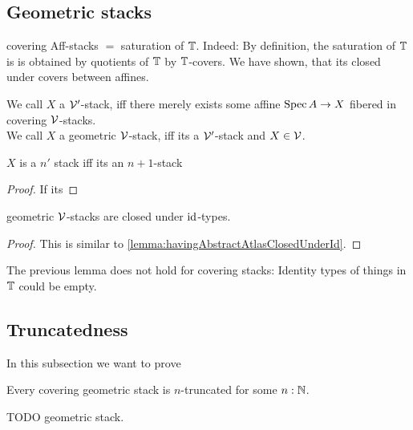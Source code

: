 \documentclass{article}
\begin{document}
\subsection{Geometric stacks}

\begin{example}
	covering Aff-stacks $=$ saturation of $\mathbb{T}$. Indeed: By definition, the saturation of $\mathbb{T}$ is is obtained by quotients of $\mathbb{T}$ by $\mathbb{T}$-covers. We have shown, that its closed under covers between affines.
\end{example}

\begin{definition}
	We call $X$ a $\mathcal{V}'$-stack, iff there merely exists some affine $\operatorname{Spec} A \to X$ fibered in covering $\mathcal{V}$-stacks. \\
	We call $X$ a geometric $\mathcal{V}$-stack, iff its a $\mathcal{V}'$-stack and $X \in \mathcal{V}$.
\end{definition}

\begin{lemma}
	$X$ is a $n'$ stack iff its an $n+1$-stack
\end{lemma}
\begin{proof}
	If its 
\end{proof}
\begin{lemma}{\label{lemma:geometricStacksClosedUnderId}}
	geometric $\mathcal{V}$-stacks are closed under $\operatorname{id}$-types.
\end{lemma}
\begin{proof}
	
	This is similar to \ref{lemma:havingAbstractAtlasClosedUnderId}.
\end{proof}
\begin{warning}
	The previous lemma does not hold for covering stacks: Identity types of things in $\mathbb{T}$ could be empty.
\end{warning}

\subsection{Truncatedness}
In this subsection we want to prove
\begin{theorem}
	Every covering geometric stack is $n$-truncated for some $n : \mathbb{N}$.
\end{theorem}
TODO geometric stack.
\end{document}
